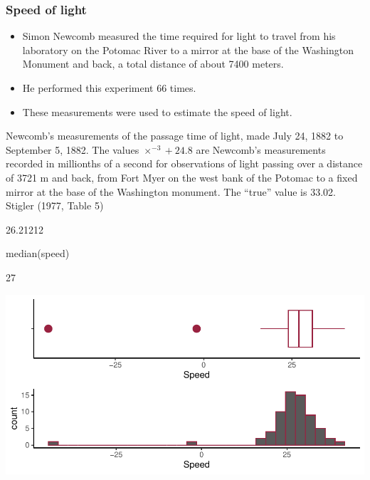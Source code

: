 \documentclass[a4paper]{article}
\begin{document}
\subsubsection{Speed of light}
\begin{itemize}
	\item Simon Newcomb measured the time required for light to travel from his laboratory on the Potomac River to a mirror at the base of the Washington Monument and back, a total distance of about 7400 meters.
	\item He performed this experiment 66 times.
	\item These measurements were used to estimate the speed of light.
\end{itemize}
Newcomb's measurements of the passage time of light, made July 24, 1882 to September 5, 1882. The values \( \times^{-3} + 24.8 \) are Newcomb's measurements recorded in millionths of a second for observations of light passing over a distance of 3721 m and back, from Fort Myer on the west bank of the Potomac to a fixed mirror at the base of the Washington monument. The ``true'' value is 33.02. Stigler (1977, Table 5)
\begin{Schunk}
\begin{Soutput}
[1] 26.21212
\end{Soutput}
\begin{Sinput}
median(speed)
\end{Sinput}
\begin{Soutput}
[1] 27
\end{Soutput}
\end{Schunk}
\begin{Schunk}


{\centering \includegraphics[width=\maxwidth]{figure/listings-unnamed-chunk-165-1} 

}

\end{Schunk}
\end{document}
